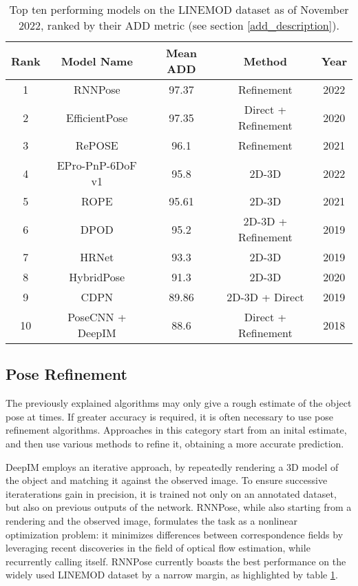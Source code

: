 \begin{table}[ht]
    \begin{center}
        \begin{tabular}{||c c c c c||} 
        \hline
        Rank & Model Name & Mean ADD & Method & Year\\ [0.5ex] 
        \hline\hline
        1 & RNNPose & 97.37 & Refinement & 2022 \\ 
        \hline
        2 & EfficientPose & 97.35 & Direct + Refinement & 2020 \\
        \hline
        3 & RePOSE & 96.1 & Refinement & 2021 \\
        \hline
        4 & EPro-PnP-6DoF v1 & 95.8 & 2D-3D & 2022\\
        \hline
        5 & ROPE & 95.61 & 2D-3D & 2021 \\
        \hline
        6 & DPOD & 95.2 & 2D-3D + Refinement & 2019\\
        \hline
        7 & HRNet  & 93.3 & 2D-3D & 2019 \\
        \hline
        8 & HybridPose & 91.3 & 2D-3D & 2020 \\
        \hline
        9 & CDPN & 89.86 & 2D-3D + Direct & 2019 \\
        \hline
        10 & PoseCNN + DeepIM & 88.6 & Direct + Refinement & 2018\\
        \hline
        \end{tabular}
    \caption{Top ten performing models on the LINEMOD dataset\cite{linemod} as of November 2022, ranked by their ADD metric (see section \ref{add_description}).}
    \label{tab:top10models}
    \end{center}
\end{table}

\subsection{Pose Refinement}
\label{ss:poserefinement}

The previously explained algorithms may only give a rough estimate of the object pose at times. If greater accuracy is required, it is often necessary to use pose refinement algorithms. Approaches in this category start from an inital estimate, and then use various methods to refine it, obtaining a more accurate prediction.

DeepIM\cite{DeepIM} employs an iterative approach, by repeatedly rendering a 3D model of the object and matching it against the observed image. To ensure successive iteraterations gain in precision, it is trained not only on an annotated dataset, but also on previous outputs of the network. RNNPose\cite{RNNPose}, while also starting from a rendering and the observed image, formulates the task as a nonlinear optimization problem: it minimizes differences between correspondence fields by leveraging recent discoveries in the field of optical flow estimation, while recurrently calling itself. RNNPose currently boasts the best performance on the widely used LINEMOD\cite{linemod} dataset by a narrow margin, as highlighted by table \ref{tab:top10models}.

